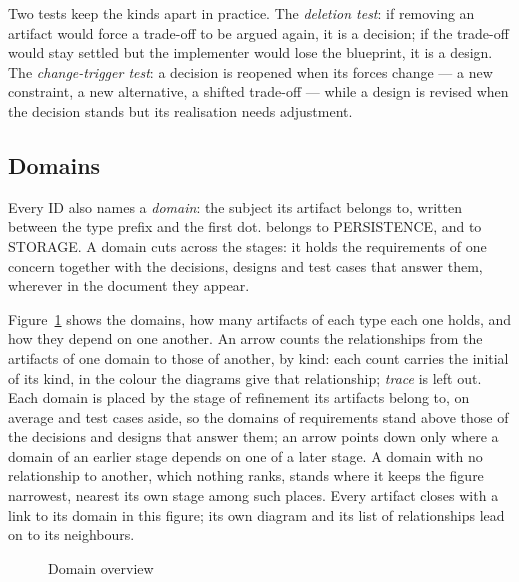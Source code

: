 Two tests keep the kinds apart in practice. The \emph{deletion test}: if
removing an artifact would force a trade-off to be argued again, it is a
decision; if the trade-off would stay settled but the implementer would lose
the blueprint, it is a design. The \emph{change-trigger test}: a decision is
reopened when its forces change --- a new constraint, a new alternative, a
shifted trade-off --- while a design is revised when the decision stands but
its realisation needs adjustment.

\subsection*{Domains}\label{sec:domains}

Every ID also names a \emph{domain}: the subject its artifact belongs to,
written between the type prefix and the first dot.
 belongs to \textsf{PERSISTENCE}, and
 to \textsf{STORAGE}. A domain cuts across the
stages: it holds the requirements of one concern together with the
decisions, designs and test cases that answer them, wherever in the document
they appear.

Figure~\ref{fig:domain-overview} shows the domains, how many artifacts of
each type each one holds, and how they depend on one another. An arrow counts
the relationships from the artifacts of one domain to those of another, by
kind: each count carries the initial of its kind, in the colour the
diagrams give that relationship; \emph{trace} is left out. Each domain is placed by the stage of refinement its artifacts
belong to, on average and test cases aside, so the domains of requirements
stand above those of the decisions and designs that answer them; an arrow
points down only where a domain of an earlier stage depends on one of a
later stage. A domain with no relationship to another, which nothing ranks,
stands where it keeps the figure narrowest, nearest its own stage among such
places. Every artifact closes with a link to its domain in this figure;
its own diagram and its list of relationships lead on to its neighbours.

\begin{figure}[htbp]
  \centering
  \makebox[\textwidth][c]{\reqoverviewdiagram}
  \caption{Domain overview}\label{fig:domain-overview}
\end{figure}
